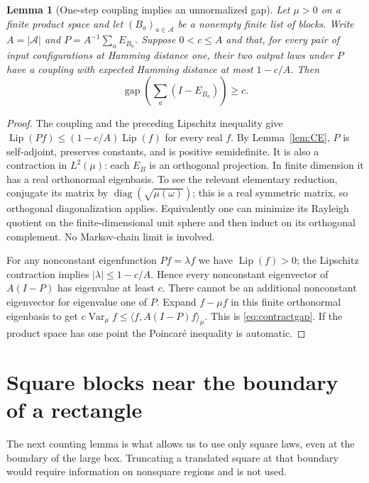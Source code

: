 \documentclass[11pt]{amsart}
\newtheorem{lemma}[theorem]{Lemma}
\theoremstyle{definition}
\newcommand{\Var}{\operatorname{Var}}
\newcommand{\gap}{\operatorname{gap}}
\newcommand{\Lip}{\operatorname{Lip}}
\newcommand{\1}{\mathbf 1}
\begin{document}
\begin{lemma}[One-step coupling implies an unnormalized gap]
\label{lem:contraction}
Let $\mu>0$ on a finite product space and let
$(B_a)_{a\in\mathcal A}$ be a nonempty finite list of blocks.
Write $A=|\mathcal A|$ and $P=A^{-1}\sum_a E_{B_a}$.
Suppose $0<c\le A$ and that, for every pair of input configurations at
Hamming distance one, their two output laws under $P$ have a coupling
with expected Hamming distance at most $1-c/A$.
Then
\begin{equation}\label{eq:contractgap}
 \gap\left(\sum_a(I-E_{B_a})\right)\ge c.
\end{equation}
\end{lemma}
\begin{proof}
The coupling and the preceding Lipschitz inequality give
$\Lip(Pf)\le(1-c/A)\Lip(f)$ for every real $f$.
By Lemma~\ref{lem:CE}, $P$ is self-adjoint, preserves constants, and is
positive semidefinite. It is also a contraction in $L^2(\mu)$: each
$E_B$ is an orthogonal projection. In finite dimension it has a real
orthonormal eigenbasis. To see the relevant elementary reduction, conjugate
its matrix by $\operatorname{diag}(\sqrt{\mu(\omega)})$; this is a real
symmetric matrix, so orthogonal diagonalization applies. Equivalently one
can minimize its Rayleigh quotient on the finite-dimensional unit sphere
and then induct on its orthogonal complement. No Markov-chain limit is
involved.

For any nonconstant eigenfunction $Pf=\lambda f$ we have $\Lip(f)>0$;
the Lipschitz contraction implies $|\lambda|\le1-c/A$. Hence every
nonconstant eigenvector of $A(I-P)$ has eigenvalue at least $c$. There
cannot be an additional nonconstant eigenvector for eigenvalue one of
$P$. Expand $f-\mu f$ in this finite orthonormal eigenbasis to get
$c\Var_\mu f\le\langle f,A(I-P)f\rangle_\mu$. This is
\eqref{eq:contractgap}. If the product space has one point the Poincar\'e
inequality is automatic.
\end{proof}

\section{Square blocks near the boundary of a rectangle}
\label{sec:count}

The next counting lemma is what allows us to use only square laws, even
at the boundary of the large box. Truncating a translated square at that
boundary would require information on nonsquare regions and is not used.
\end{document}
